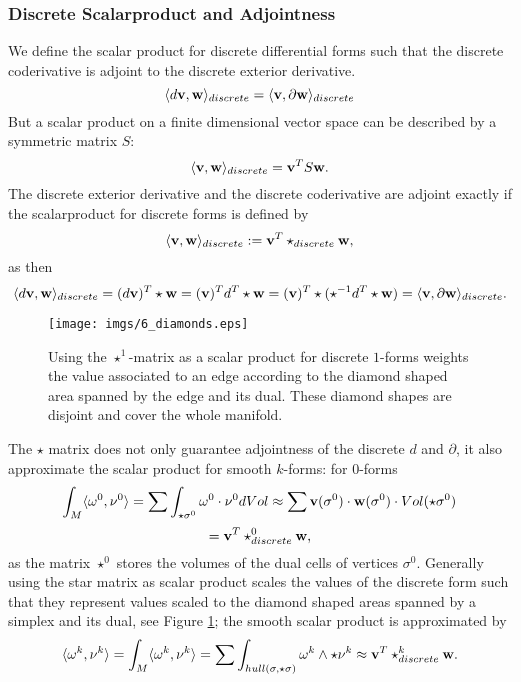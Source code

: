 \subsubsection{Discrete Scalarproduct and Adjointness}
\label{subsec:5_discreteScalarprod}
We define the scalar product for discrete differential forms such that the discrete coderivative is adjoint to the discrete exterior derivative.
\[\langle d\textbf{v}, \textbf{w} \rangle_{discrete} = \langle \textbf{v}, \partial \textbf{w}\rangle_{discrete}\]
But a scalar product on a finite dimensional vector space can be  described by a symmetric matrix $S$:
\[\langle \textbf{v}, \textbf{w} \rangle_{discrete} = \textbf{v}^TS\textbf{w}.\]
The discrete exterior derivative and the discrete coderivative are adjoint exactly if the scalarproduct for discrete forms is defined by
\begin{equation}
\langle \textbf{v}, \textbf{w} \rangle_{discrete} := \textbf{v}^T\star_{discrete}\textbf{w},
\label{eq:discreteScalarprod}
\end{equation}
as then
\[\langle d\textbf{v}, \textbf{w} \rangle_{discrete} = (d\textbf{v})^T\star \textbf{w} =  
(\textbf{v})^T d^T\star \textbf{w} =  (\textbf{v})^T \star (\star^{-1}d^T\star \textbf{w}) =  \langle \textbf{v}, \partial \textbf{w}\rangle_{discrete}.\]

\begin{figure}%
\begin{center}
\texttt{[image: imgs/6\_diamonds.eps]}%
\end{center}
\caption{Using the $\star^1$-matrix as a scalar product for discrete $1$-forms weights the value associated to an edge according to the diamond shaped area spanned by the edge and its dual. These diamond shapes are disjoint and cover the whole manifold.}%
\label{fig:6_diamonds}%
\end{figure}

The $\star$ matrix does not only guarantee adjointness of the discrete $d$ and $\partial$, it also approximate the scalar product for smooth $k$-forms: for 0-forms
\[\int_{M}\langle \omega^0, \nu^0 \rangle = \sum \int_{\star \sigma^0} \omega^0 \cdot \nu^0 dVol \approx \sum \textbf{v}(\sigma^0) \cdot \textbf{w}(\sigma^0) \cdot Vol(\star\sigma^0) \]
\[= \textbf{v}^T \star^0_{discrete} \textbf{w},\]
as the matrix $\star^0$ stores the volumes of the dual cells of vertices $\sigma^0$. Generally using the star matrix as scalar product scales the values of the discrete form such that they represent values scaled to the diamond shaped areas spanned by a simplex and its dual, see Figure \ref{fig:6_diamonds}; the smooth scalar product is approximated by
\[\langle \omega^k, \nu^k\rangle = \int_{M}\langle \omega^k, \nu^k \rangle = \sum \int_{hull(\sigma ,\star \sigma)} \omega^k \wedge \star \nu^k \approx \textbf{v}^T \star^k_{discrete} \textbf{w}.\]
 
